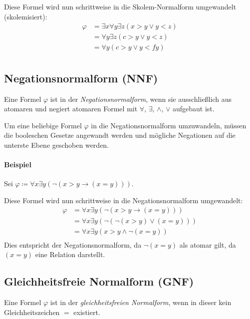                 Diese Formel wird nun schrittweise in die Skolem-Normalform umgewandelt (skolemisiert):
                \begin{align*}
                    \varphi &= \exists x \forall y \exists z (x > y \lor y < z) \tag{1. Existenzquantor} \\
                            &= \forall y \exists z (c > y \lor y < z) \tag{2. Existenzquantor} \\
                            &= \forall y (c > y \lor y < fy) \tag{Skolem-Normalform} \\
                \end{align*}

        \subsection{Negationsnormalform (NNF)}
            Eine Formel $ \varphi $ ist in der \textit{Negationsnormalform}, wenn sie ausschließlich aus atomaren und negiert atomaren Formel mit $ \forall $, $ \exists $, $ \land $, $ \lor $ aufgebaut ist.

            Um eine beliebige Formel $ \varphi $ in die Negationsnormalform umzuwandeln, müssen die booleschen Gesetze angewandt werden und mögliche Negationen auf die unterste Ebene geschoben werden.

            \paragraph{Beispiel}
                Sei $ \varphi \coloneqq \forall x \exists y (\lnot (x > y \rightarrow (x = y))) $.

                Diese Formel wird nun schrittweise in die Negationsnormalform umgewandelt:
                \begin{align*}
                    \varphi &= \forall x \exists y (\lnot (x > y \rightarrow (x = y))) \\
                            &= \forall x \exists y (\lnot (\lnot (x > y) \lor (x = y))) \\
                            &= \forall x \exists y (x > y \land \lnot (x = y)) \\
                \end{align*}
                Dies entspricht der Negationsnormalform, da $ \lnot (x = y) $ als atomar gilt, da $ (x = y) $ eine Relation darstellt.

        \subsection{Gleichheitsfreie Normalform (GNF)}
            Eine Formel $ \varphi $ ist in der \textit{gleichheitsfreien Normalform}, wenn in dieser kein Gleichheitszeichen $ = $ existiert.

